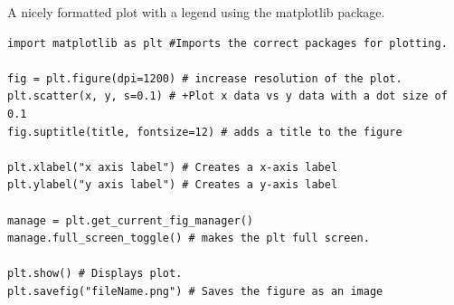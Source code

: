 A nicely formatted plot with a legend using the matplotlib package.
\begin{lstlisting}
import matplotlib as plt #Imports the correct packages for plotting.

fig = plt.figure(dpi=1200) # increase resolution of the plot.
plt.scatter(x, y, s=0.1) # +Plot x data vs y data with a dot size of 0.1
fig.suptitle(title, fontsize=12) # adds a title to the figure

plt.xlabel("x axis label") # Creates a x-axis label
plt.ylabel("y axis label") # Creates a y-axis label

manage = plt.get_current_fig_manager()
manage.full_screen_toggle() # makes the plt full screen.

plt.show() # Displays plot.
plt.savefig("fileName.png") # Saves the figure as an image
\end{lstlisting}

